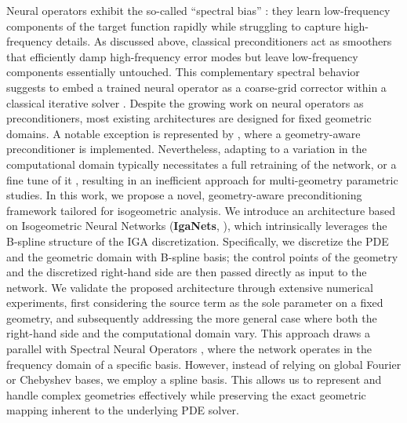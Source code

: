 \documentclass{article}
\theoremstyle{plain}
\numberwithin{equation}{section}
\begin{document}
Neural operators exhibit the so-called ``spectral bias'' \cite{rahaman2019spectral}: they learn low-frequency components of the target function rapidly while struggling to capture high-frequency details. As discussed above, classical preconditioners act as smoothers that efficiently damp high-frequency error modes but leave low-frequency components essentially untouched. This complementary spectral behavior suggests to embed a trained neural operator as a coarse-grid corrector within a classical iterative solver \cite{kopanivcakova2025deeponet, lee2025hybrid, karniadakis2025nonlinearprec, karniadakis2025nspod}.
Despite the growing work on neural operators as preconditioners, most existing architectures are designed for fixed geometric domains. A notable exception is represented by \cite{lee2025hybrid}, where a geometry-aware preconditioner is implemented.
Nevertheless, adapting to a variation in the computational domain typically necessitates a full retraining of the network, or a fine tune of it \cite{kahana2023geometry}, resulting in an inefficient approach for multi-geometry parametric studies.
In this work, we propose a novel, geometry-aware preconditioning framework tailored for isogeometric analysis. We introduce an architecture based on Isogeometric Neural Networks (\textbf{IgaNets}, \cite{moller2026iganet}), which intrinsically leverages the B-spline structure of the IGA discretization.
Specifically, we discretize the PDE and the geometric domain with B-spline basis; the control points of the geometry and the discretized right-hand side are then passed directly as input to the network. We validate the proposed architecture through extensive numerical experiments, first considering the source term as the sole parameter on a fixed geometry, and subsequently addressing the more general case where both the right-hand side and the computational domain vary.
This approach draws a parallel with Spectral Neural Operators \cite{fanaskov2023spectral}, where the network operates in the frequency domain of a specific basis. However, instead of relying on global Fourier or Chebyshev bases, we employ a spline basis. This allows us to represent and handle complex geometries effectively while preserving the exact geometric mapping inherent to the underlying PDE solver.
\end{document}
